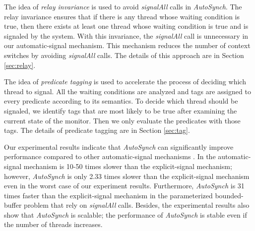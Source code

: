 \documentclass[preprint]{sigplanconf}
\begin{document}
The idea of {\em relay invariance} is used to avoid {\em signalAll} calls in {\em
AutoSynch}.
The relay invariance ensures that if there is any thread whose waiting condition is true, then
there exists at least one thread whose waiting condition is  true and is signaled by the system.
With this invariance, the {\em signalAll} call 
is unnecessary in our automatic-signal mechanism. This mechanism reduces 
the number of context switches by avoiding {\em signalAll} calls. 
The details of this approach are in Section \ref{sec:relay}.


The idea of {\em predicate tagging} is used to accelerate the process of deciding which thread to signal.
All the waiting conditions are analyzed and tags are assigned to every predicate
according to its semantics. To decide which thread should be 
signaled, we identify tags that are most likely to be true after examining the 
current state of the monitor. Then we only evaluate the predicates with 
those tags. 
The details of predicate tagging are in Section \ref{sec:tag}.

Our experimental results indicate that {\em AutoSynch} can significantly improve
performance compared to other automatic-signal mechanisms \cite{bh05}. In \cite{bfc95,bh05}
the automatic-signal mechanism is 10-50 times
slower than the explicit-signal mechanism; however, {\em AutoSynch} is 
only 2.33 times slower than the explicit-signal mechanism even in the worst 
case of our experiment results. Furthermore, {\em AutoSynch} is 31
times faster than the explicit-signal mechanism in the parameterized
bounded-buffer problem that rely on 
{\em signalAll} calls. Besides, the experimental results also show that {\em AutoSynch} 
is scalable; the performance of {\em AutoSynch} is stable even if the number of 
threads increases. 
\end{document}
